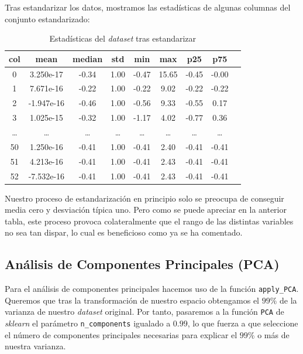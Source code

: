 \documentclass[11pt]{article}
\begin{document}
Tras estandarizar los datos, mostramos las estadísticas de algunas columnas del conjunto estandarizado:

\begin{table}[H]
  \centering
  \begin{tabular}{|c|c|c|c|c|c|c|c|c|}
  \hline
\textbf{col}  &         \textbf{mean}&         \textbf{median}&           \textbf{std}&     \textbf{min}&           \textbf{max}&           \textbf{p25}&           \textbf{p75} \\
\hline
0  &  3.250e-17& -0.34&  1.00&  -0.47&   15.65& -0.45& -0.00\\
1  &  7.671e-16& -0.22&  1.00&  -0.22&    9.02& -0.22& -0.22\\
2  & -1.947e-16& -0.46&  1.00&  -0.56&    9.33& -0.55&  0.17\\
3  &  1.025e-15& -0.32&  1.00&  -1.17&    4.02& -0.77&  0.36\\
\ldots  &  \ldots & \ldots &  \ldots &  \ldots &    \ldots & \ldots &  \ldots \\
50 &  1.250e-16& -0.41&  1.00&  -0.41&    2.40& -0.41& -0.41\\
51 &  4.213e-16& -0.41&  1.00&  -0.41&    2.43& -0.41& -0.41\\
52 & -7.532e-16& -0.41&  1.00&  -0.41&    2.43& -0.41& -0.41\\
\hline
  \end{tabular}
  \caption{Estadísticas del \emph{dataset} tras estandarizar}
  \label{tabla_std}
\end{table}

Nuestro proceso de estandarización en principio solo se preocupa de conseguir media cero y desviación típica uno. Pero como se puede apreciar en la anterior tabla, este proceso provoca colateralmente que el rango de las distintas variables no sea tan dispar, lo cual es beneficioso como ya se ha comentado.

\subsection{Análisis de Componentes Principales (PCA)}

Para el análisis de componentes principales hacemos uso de la función \lstinline{apply_PCA}. Queremos que tras la transformación de nuestro espacio obtengamos el $99\%$ de la varianza de nuestro \emph{dataset} original. Por tanto, pasaremos a la función \lstinline{PCA} de \emph{sklearn} el parámetro \lstinline{n_components} igualado a $0.99$, lo que fuerza a que seleccione el número de componentes principales necesarias para explicar el $99\%$ o más de nuestra varianza.
\end{document}
